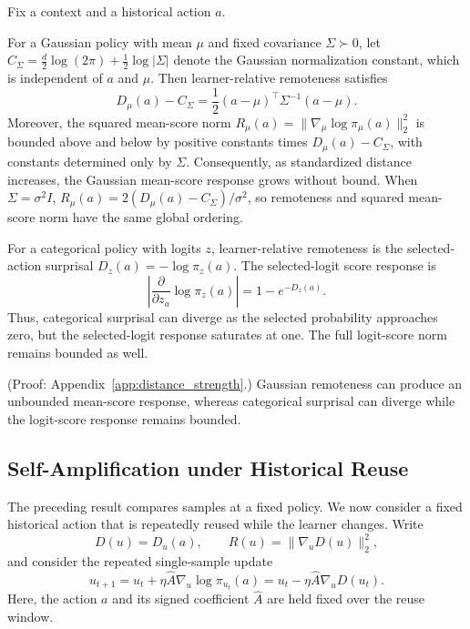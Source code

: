 \documentclass[sigconf,anonymous,review]{acmart}
\theoremstyle{acmdefinition}
\begin{document}
\begin{proposition}
\label{prop:distance_strength}
Fix a context and a historical action \(a\).

For a Gaussian policy with mean \(\mu\) and fixed covariance
\(\Sigma\succ0\), let
\(C_\Sigma=\frac{d}{2}\log(2\pi)+\frac12\log|\Sigma|\) denote the
Gaussian normalization constant, which is independent of \(a\) and
\(\mu\). Then learner-relative remoteness satisfies
\begin{equation}
    D_\mu(a)-C_\Sigma
    =
    \frac12
    (a-\mu)^\top\Sigma^{-1}(a-\mu).
    \label{eq:gaussian_remoteness_mahalanobis}
\end{equation}
Moreover, the squared mean-score norm
\(R_\mu(a)=\|\nabla_\mu\log\pi_\mu(a)\|_2^2\) is bounded above and below
by positive constants times \(D_\mu(a)-C_\Sigma\), with constants
determined only by \(\Sigma\). Consequently, as standardized distance
increases, the Gaussian mean-score response grows without bound. When
\(\Sigma=\sigma^2I\), \(R_\mu(a)=2(D_\mu(a)-C_\Sigma)/\sigma^2\), so
remoteness and squared mean-score norm have the same global ordering.

For a categorical policy with logits \(z\), learner-relative remoteness is
the selected-action surprisal \(D_z(a)=-\log\pi_z(a)\). The selected-logit
score response is
\begin{equation}
    \left|
    \frac{\partial}{\partial z_a}
    \log \pi_z(a)
    \right|
    =
    1-e^{-D_z(a)}.
    \label{eq:categorical_selected_score}
\end{equation}
Thus, categorical surprisal can diverge as the selected probability
approaches zero, but the selected-logit response saturates at one. The
full logit-score norm remains bounded as well.
\end{proposition}

(Proof: Appendix~\ref{app:distance_strength}.) Gaussian remoteness can
produce an unbounded mean-score response, whereas categorical surprisal can
diverge while the logit-score response remains bounded.


\subsection{Self-Amplification under Historical Reuse}
\label{sec:self_amplification}

The preceding result compares samples at a fixed policy. We now consider
a fixed historical action that is repeatedly reused while the learner
changes. Write
\[
    D(u)=D_u(a),
    \qquad
    R(u)=\|\nabla_uD(u)\|_2^2,
\]
and consider the repeated single-sample update
\begin{equation}
    u_{t+1}
    =
    u_t
    +
    \eta\widehat A\nabla_u\log\pi_{u_t}(a)
    =
    u_t
    -
    \eta\widehat A\nabla_uD(u_t).
    \label{eq:single_sample_reuse_update}
\end{equation}
Here, the action \(a\) and its signed coefficient \(\widehat A\) are
held fixed over the reuse window.
\end{document}

